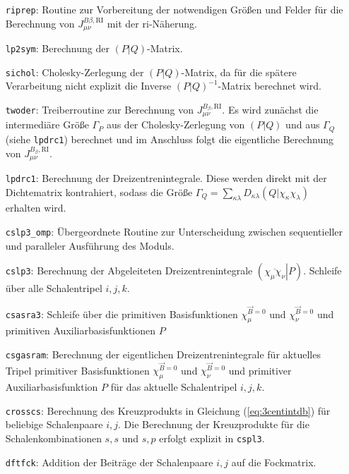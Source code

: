 	\begin{itemize}[leftmargin=65pt]
	    \item[\texttt{riprep}:] Routine zur Vorbereitung der notwendigen Größen und Felder für die Berechnung von $J_{\mu\nu}^{B\beta ,\textrm{RI}}$ mit der \ac{ri}-Näherung. 
	    \item[\texttt{lp2sym}:] Berechnung der $\left(P\vert Q\right)$-Matrix.
	    \item[\texttt{sichol}:] Cholesky-Zerlegung der $\left(P\vert Q\right)$-Matrix, da für die spätere Verarbeitung nicht explizit die Inverse $\left(P\vert Q\right)^{-1}$-Matrix berechnet wird.
	    \item[\texttt{twoder}:] Treiberroutine zur Berechnung von $J_{\mu\nu}^{B_\beta ,\textrm{RI}}$. Es wird zunächst die intermediäre Größe $\Gamma_P$ aus der Cholesky-Zerlegung von $\left(P\vert Q\right)$ und aus $\Gamma_Q$ (siehe \texttt{lpdrc1}) berechnet und im Anschluss folgt die eigentliche Berechnung von $J_{\mu\nu}^{B_\beta ,\textrm{RI}}$.
	    \item[\texttt{lpdrc1}:] Berechnung der Dreizentrenintegrale. Diese werden direkt mit der Dichtematrix kontrahiert, sodass die Größe $\Gamma_Q=\sum_{\kappa\lambda}D_{\kappa\lambda}\left(Q\vert\chi_\kappa\chi_\lambda\right)$ erhalten wird.
	    \item[\texttt{cslp3\_omp}:] Übergeordnete Routine zur Unterscheidung zwischen sequentieller und paralleler Ausführung des Moduls.
	    \item[\texttt{cslp3}:] Berechnung der Abgeleiteten Dreizentrenintegrale $\left(\left.\overline{\chi_\mu\chi_\nu}\right\vert P\right)$. Schleife über alle Schalentripel $i,j,k$.
	    \item[\texttt{csasra3}:] Schleife über die primitiven Basisfunktionen $\chi_\mu^{\vec{B}=0}$ und $\chi_\nu^{\vec{B}=0}$ und primitiven Auxiliarbasisfunktionen $P$
	    \item[\texttt{csgasram}:] Berechnung der eigentlichen Dreizentrenintegrale für aktuelles Tripel primitiver Basisfunktionen $\chi_\mu^{\vec{B}=0}$ und $\chi_\nu^{\vec{B}=0}$ und primitiver Auxiliarbasisfunktion $P$ für das aktuelle Schalentripel $i,j,k$.
	    \item[\texttt{crosscs}:] Berechnung des Kreuzprodukts in Gleichung (\ref{eq:3centintdb}) für beliebige Schalenpaare $i,j$. Die Berechnung der Kreuzprodukte für die Schalenkombinationen $s,s$ und $s,p$ erfolgt explizit in \texttt{cspl3}.
	    \item[\texttt{dftfck}:] Addition der Beiträge der Schalenpaare $i,j$ auf die Fockmatrix.
	\end{itemize}
	
